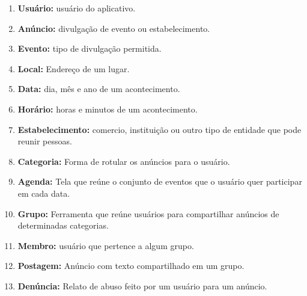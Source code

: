 \documentclass{article}
\begin{document}
\begin{enumerate}[label=\textbf{\arabic*}]
\item \textbf{Usuário:} usuário do aplicativo.
\item \textbf{Anúncio:} divulgação de evento ou estabelecimento.
\item \textbf{Evento:} tipo de divulgação permitida.
\item \textbf{Local:} Endereço de um lugar.
\item \textbf{Data:} dia, mês e ano de um acontecimento.
\item \textbf{Horário:} horas e minutos de um acontecimento.
\item \textbf{Estabelecimento:} comercio, instituição ou outro tipo de entidade que pode reunir pessoas.
\item \textbf{Categoria:} Forma de rotular os anúncios para o usuário.
\item \textbf{Agenda:} Tela que reúne o conjunto de eventos que o usuário quer participar em cada data.
\item \textbf{Grupo:} Ferramenta que reúne usuários para compartilhar anúncios de determinadas categorias.
\item \textbf{Membro:} usuário que pertence a algum grupo.
\item \textbf{Postagem:} Anúncio com texto compartilhado em um grupo.
\item \textbf{Denúncia:} Relato de abuso feito por um usuário para um anúncio.
\end{enumerate}
\end{document}
